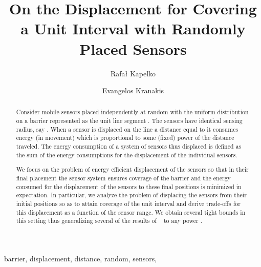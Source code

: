 \documentclass[final,5p,times,twocolumn]{elsarticle_mod}
\begin{document}
\begin{frontmatter}

\title{On the Displacement for Covering a Unit Interval with Randomly Placed Sensors}

\author[pwr]{Rafa\l{} Kapelko}
\author[scs]{Evangelos Kranakis}
\address[pwr]{ Department of Computer Science, Faculty of Fundamental Problems of Technology, Wroc{\l}aw University of Technology, Poland}
\address[scs]{School of Computer Science, Carleton University, Ottawa, ON, Canada}
\begin{abstract}

Consider  mobile sensors placed independently at random with the uniform distribution on a barrier represented as the unit line segment . 
The sensors have identical sensing radius, say . When a sensor is displaced on the line a distance equal to  it consumes energy (in movement) which is proportional to some (fixed) 
power  of the distance  traveled. The energy consumption of a system of  sensors thus displaced is defined as the sum of the energy consumptions for the displacement 
of the individual sensors. 

We focus on the problem of energy efficient displacement of the sensors so that in their final placement the sensor system ensures coverage of the barrier and the energy consumed 
for the displacement of the sensors to these final positions is minimized in expectation. In particular, we analyze the problem of displacing the sensors from their initial positions 
so as to attain coverage of the unit interval and derive trade-offs for this displacement as a function of the sensor range. We obtain several tight bounds in this setting 
thus generalizing several of the results of ~\cite{spa_2013} to any power .  


\end{abstract} 

\begin{keyword}
  barrier, displacement, distance, random, sensors,
\end{keyword}

\end{frontmatter}
\end{document}
